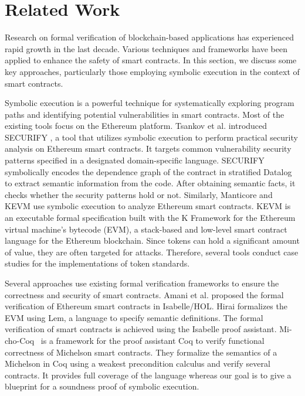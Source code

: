 \section{Related Work}
\label{sec:related-work}

Research on formal verification of blockchain-based applications
has experienced rapid growth in the last decade. Various techniques
and frameworks have been applied to enhance the safety of smart
contracts. In this section, we 
discuss some key approaches, particularly those employing symbolic
execution in the context of smart contracts. 
 
Symbolic execution is a powerful technique for
systematically exploring program paths and identifying potential
vulnerabilities in smart contracts. Most of the existing tools focus
on the Ethereum platform. Tsankov et al. introduced
SECURIFY \cite{securify}, a tool that utilizes symbolic execution to
perform practical security analysis on Ethereum smart contracts. It
targets common vulnerability security patterns specified in a
designated domain-specific language. SECURIFY symbolically encodes the
dependence graph of the contract in stratified Datalog to extract
semantic information from the code. After obtaining semantic facts, it
checks whether the security patterns hold or not. Similarly, Manticore
\cite{manticore} and KEVM \cite{kevm} use symbolic execution to
analyze Ethereum smart contracts. KEVM is an executable formal
specification built with the K Framework for the Ethereum virtual
machine's bytecode (EVM), a stack-based and low-level smart contract
language for the Ethereum blockchain. Since tokens can hold a
significant amount of value, they are often targeted for
attacks. Therefore, several tools \cite{kevm,park} conduct case
studies for the implementations of token standards. 

Several approaches use existing formal verification frameworks to
ensure the correctness and security of smart contracts. Amani et
al. \cite{isabelle} proposed the formal verification of Ethereum smart
contracts in Isabelle/HOL. Hirai \cite{hirai} formalizes the EVM using
Lem, a language to specify semantic definitions. The formal
verification of smart contracts is achieved using the Isabelle proof
assistant. 
Mi-cho-Coq~\cite{mi-cho-coq} is a framework for the proof assistant Coq to verify
functional correctness of Michelson smart contracts. They formalize
the semantics of a Michelson in Coq using a weakest precondition
calculus and verify several contracts.
It provides full coverage of the language whereas our goal is to give
a blueprint for a soundness proof of symbolic execution.

